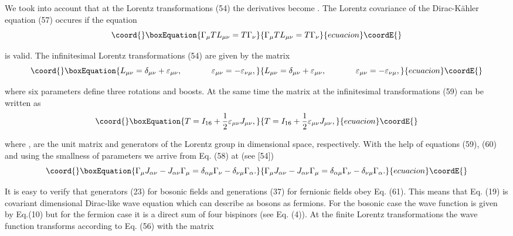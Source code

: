 \documentclass[a4paper,12pt]{article}
\begin{document}
We took into account that at the Lorentz transformations (54) the
derivatives \myHighlight{$\partial _\mu $}\coordHE{} become \coordHE{}. The Lorentz covariance of the Dirac-K\"ahler equation (57)
occures if the equation
\begin{equation}\coord{}\boxEquation{
\Gamma _\mu TL_{\mu \nu }=T\Gamma _\nu  \label{58}
}{
\Gamma _\mu TL_{\mu \nu }=T\Gamma _\nu  }{ecuacion}\coordE{}\end{equation}

is valid. The infinitesimal Lorentz transformations (54) are given by the
matrix
\begin{equation}\coord{}\boxEquation{
L_{\mu \nu }=\delta _{\mu \nu }+\varepsilon _{\mu \nu } ,
\hspace{0.5in} \varepsilon _{\mu \nu }=-\varepsilon _{\nu \mu } ,
\label{59}
}{
L_{\mu \nu }=\delta _{\mu \nu }+\varepsilon _{\mu \nu } ,
\hspace{0.5in} \varepsilon _{\mu \nu }=-\varepsilon _{\nu \mu } ,
}{ecuacion}\coordE{}\end{equation}

where six parameters \myHighlight{$\varepsilon _{\mu \nu }$}\coordHE{} define three rotations and
boosts. At the same time the matrix \coordHE{} at the infinitesimal transformations
(59) can be written as
\begin{equation}\coord{}\boxEquation{
T=I_{16}+\frac 12\varepsilon _{\mu \nu }J_{\mu \nu } , \label{60}
}{
T=I_{16}+\frac 12\varepsilon _{\mu \nu }J_{\mu \nu } , }{ecuacion}\coordE{}\end{equation}

where \coordHE{}, \coordHE{} are the unit matrix and generators of the
Lorentz group in \coordHE{}dimensional space, respectively. With the help of
equations (59), (60) and using the smallness of parameters \myHighlight{$\varepsilon
_{\mu \nu }$}\coordHE{} we arrive from Eq. (58) at (see [54])
\begin{equation}\coord{}\boxEquation{
\Gamma _\mu J_{\alpha \nu }-J_{\alpha \nu }\Gamma _\mu =\delta
_{\alpha \mu }\Gamma _\nu -\delta _{\nu \mu }\Gamma _\alpha .
\label{61}
}{
\Gamma _\mu J_{\alpha \nu }-J_{\alpha \nu }\Gamma _\mu =\delta
_{\alpha \mu }\Gamma _\nu -\delta _{\nu \mu }\Gamma _\alpha .
}{ecuacion}\coordE{}\end{equation}

It is easy to verify that generators (23) for bosonic fields and generations
(37) for fernionic fields obey Eq. (61). This means that Eq. (19) is
covariant \coordHE{}dimensional Dirac-like wave equation which can describe as
bosons as fermions. For the bosonic case the wave function \coordHE{} is
given by Eq.(10) but for the fermion case it is a direct sum of four
bispinors (see Eq. (4)). At the finite Lorentz transformations the wave
function transforms according to Eq. (56) with the matrix
\end{document}
